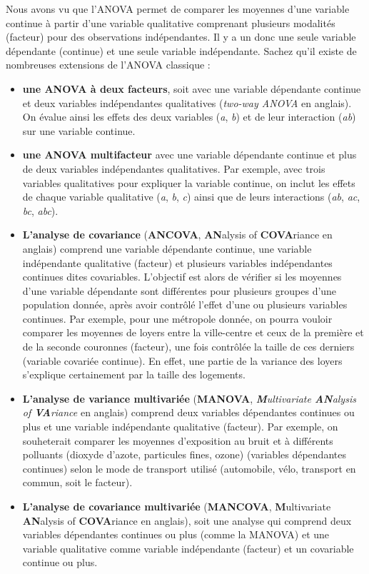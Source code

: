 \documentclass[
  11pt,
  french,
]{book}
\makeatletter
\newenvironment{kframev}{%
\medskip{}
\setlength{\fboxsep}{.8em}
 \def\at@end@of@kframev{}%
 \ifinner\ifhmode%
  \def\at@end@of@kframev{\end{minipage}}%
  \begin{minipage}{\columnwidth}%
 \fi\fi%
 \def\FrameCommand##1{\hskip\@totalleftmargin \hskip-\fboxsep
 \colorbox{shadebluecolor}{##1}\hskip-\fboxsep
     \hskip-\linewidth \hskip-\@totalleftmargin \hskip\columnwidth}%
 \MakeFramed {\advance\hsize-\width
   \@totalleftmargin\z@ \linewidth\hsize
   \@setminipage}}%
 {\par\unskip\endMakeFramed%
 \at@end@of@kframev}
\newenvironment{rmdblock}[1]
  {
  \begin{itemize}
  \renewcommand{\labelitemi}{
    \raisebox{-.7\height}[0pt][0pt]{
      {\setkeys{Gin}{width=3em,keepaspectratio}\texttt{[image: images/\#1]}}
    }
  }
  \setlength{\fboxsep}{1em}
  \begin{kframev}
  \small
  \item
  }
  {
  \end{kframev}
  \end{itemize}
  }
\newenvironment{bloc_aller_loin}
  {\begin{rmdblock}{aller_loin}}
  {\end{rmdblock}}
\makeatother
\begin{document}
\begin{bloc_aller_loin}

Nous avons vu que l'ANOVA permet de comparer les moyennes d'une variable continue à partir d'une variable qualitative comprenant plusieurs modalités (facteur) pour des observations indépendantes. Il y a un donc une seule variable dépendante (continue) et une seule variable indépendante. Sachez qu'il existe de nombreuses extensions de l'ANOVA classique :

\begin{itemize}
\item
  \textbf{une ANOVA à deux facteurs}, soit avec une variable dépendante continue et deux variables indépendantes qualitatives (\emph{two-way ANOVA} en anglais). On évalue ainsi les effets des deux variables (\emph{a}, \emph{b}) et de leur interaction (\emph{ab}) sur une variable continue.
\item
  \textbf{une ANOVA multifacteur} avec une variable dépendante continue et plus de deux variables indépendantes qualitatives. Par exemple, avec trois variables qualitatives pour expliquer la variable continue, on inclut les effets de chaque variable qualitative (\emph{a}, \emph{b}, \emph{c}) ainsi que de leurs interactions (\emph{ab}, \emph{ac}, \emph{bc}, \emph{abc}).
\item
  \textbf{L'analyse de covariance} (\textbf{ANCOVA}, \textbf{AN}alysis of \textbf{COVA}riance en anglais) comprend une variable dépendante continue, une variable indépendante qualitative (facteur) et plusieurs variables indépendantes continues dites covariables. L'objectif est alors de vérifier si les moyennes d'une variable dépendante sont différentes pour plusieurs groupes d'une population donnée, après avoir contrôlé l'effet d'une ou plusieurs variables continues. Par exemple, pour une métropole donnée, on pourra vouloir comparer les moyennes de loyers entre la ville-centre et ceux de la première et de la seconde couronnes (facteur), une fois contrôlée la taille de ces derniers (variable covariée continue). En effet, une partie de la variance des loyers s'explique certainement par la taille des logements.
\item
  \textbf{L'analyse de variance multivariée} (\textbf{MANOVA}, \emph{\textbf{M}ultivariate \textbf{AN}alysis of \textbf{VA}riance} en anglais) comprend deux variables dépendantes continues ou plus et une variable indépendante qualitative (facteur). Par exemple, on souheterait comparer les moyennes d'exposition au bruit et à différents polluants (dioxyde d'azote, particules fines, ozone) (variables dépendantes continues) selon le mode de transport utilisé (automobile, vélo, transport en commun, soit le facteur).
\item
  \textbf{L'analyse de covariance multivariée} (\textbf{MANCOVA}, \textbf{M}ultivariate \textbf{AN}alysis of \textbf{COVA}riance en anglais), soit une analyse qui comprend deux variables dépendantes continues ou plus (comme la MANOVA) et une variable qualitative comme variable indépendante (facteur) et un covariable continue ou plus.
\end{itemize}


\end{bloc_aller_loin}
\end{document}
